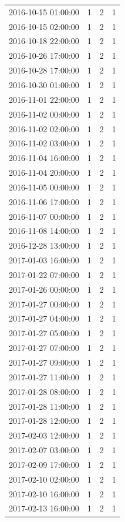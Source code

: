 \begin{tabular}{lrrr}
2016-10-15 01:00:00 & 1 & 2 & 1 \\
2016-10-15 02:00:00 & 1 & 2 & 1 \\
2016-10-18 22:00:00 & 1 & 2 & 1 \\
2016-10-26 17:00:00 & 1 & 2 & 1 \\
2016-10-28 17:00:00 & 1 & 2 & 1 \\
2016-10-30 01:00:00 & 1 & 2 & 1 \\
2016-11-01 22:00:00 & 1 & 2 & 1 \\
2016-11-02 00:00:00 & 1 & 2 & 1 \\
2016-11-02 02:00:00 & 1 & 2 & 1 \\
2016-11-02 03:00:00 & 1 & 2 & 1 \\
2016-11-04 16:00:00 & 1 & 2 & 1 \\
2016-11-04 20:00:00 & 1 & 2 & 1 \\
2016-11-05 00:00:00 & 1 & 2 & 1 \\
2016-11-06 17:00:00 & 1 & 2 & 1 \\
2016-11-07 00:00:00 & 1 & 2 & 1 \\
2016-11-08 14:00:00 & 1 & 2 & 1 \\
2016-12-28 13:00:00 & 1 & 2 & 1 \\
2017-01-03 16:00:00 & 1 & 2 & 1 \\
2017-01-22 07:00:00 & 1 & 2 & 1 \\
2017-01-26 00:00:00 & 1 & 2 & 1 \\
2017-01-27 00:00:00 & 1 & 2 & 1 \\
2017-01-27 04:00:00 & 1 & 2 & 1 \\
2017-01-27 05:00:00 & 1 & 2 & 1 \\
2017-01-27 07:00:00 & 1 & 2 & 1 \\
2017-01-27 09:00:00 & 1 & 2 & 1 \\
2017-01-27 11:00:00 & 1 & 2 & 1 \\
2017-01-28 08:00:00 & 1 & 2 & 1 \\
2017-01-28 11:00:00 & 1 & 2 & 1 \\
2017-01-28 12:00:00 & 1 & 2 & 1 \\
2017-02-03 12:00:00 & 1 & 2 & 1 \\
2017-02-07 03:00:00 & 1 & 2 & 1 \\
2017-02-09 17:00:00 & 1 & 2 & 1 \\
2017-02-10 02:00:00 & 1 & 2 & 1 \\
2017-02-10 16:00:00 & 1 & 2 & 1 \\
2017-02-13 16:00:00 & 1 & 2 & 1 \\

\end{tabular}
